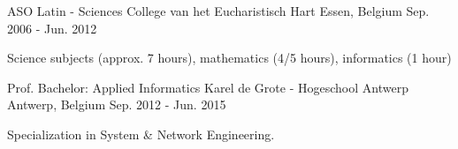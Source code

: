 

\begin{cventries}

  \cventry
    {ASO Latin - Sciences} %
    {College van het Eucharistisch Hart} %
    {Essen, Belgium} %
    {Sep. 2006 - Jun. 2012} %
    {
      \begin{cvitems} %
        \item {Science subjects (approx. 7 hours), mathematics (4/5 hours), informatics (1 hour)}
      \end{cvitems}
    }

  \cventry
    {Prof. Bachelor: Applied Informatics} %
    {Karel de Grote - Hogeschool Antwerp} %
    {Antwerp, Belgium} %
    {Sep. 2012 - Jun. 2015} %
    {
      \begin{cvitems} %
        \item {Specialization in System \& Network Engineering.}
      \end{cvitems}
    }

\end{cventries}
